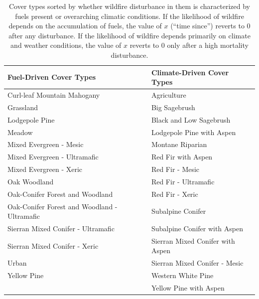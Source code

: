 \begin{itemize}
\begin{table}[htbp]
\small
\centering
\caption{Cover types sorted by whether wildfire disturbance in them is characterized by fuels present or overarching climatic conditions. If the likelihood of wildfire depends on the accumulation of fuels, the value of $x$ (``time since'') reverts to 0 after any disturbance. If the likelihood of wildfire depends primarily on climate and weather conditions, the value of $x$ reverts to 0 only after a high mortality disturbance.}
\label{howdriven}
\begin{tabular}{ll}
\hline
\textbf{Fuel-Driven Cover Types} 				& \textbf{Climate-Driven Cover Types}	\\
\hline
Curl-leaf Mountain Mahogany 					& Agriculture   						\\
Grassland     									& Big Sagebrush 						\\
Lodgepole Pine    								& Black and Low Sagebrush				\\
Meadow											& Lodgepole Pine with Aspen 			\\
Mixed Evergreen - Mesic							& Montane Riparian						\\
Mixed Evergreen - Ultramafic     				& Red Fir with Aspen   					\\
Mixed Evergreen - Xeric 						& Red Fir - Mesic    					\\
Oak Woodland 									& Red Fir - Ultramafic 					\\
Oak-Conifer Forest and Woodland 				& Red Fir - Xeric 						\\ 	
Oak-Conifer Forest and Woodland - Ultramafic 	& Subalpine Conifer 					\\
Sierran Mixed Conifer - Ultramafic 				& Subalpine Conifer with Aspen 			\\
Sierran Mixed Conifer - Xeric 					& Sierran Mixed Conifer with Aspen 		\\
Urban 											& Sierran Mixed Conifer - Mesic 		\\
Yellow Pine 									& Western White Pine 					\\
												& Yellow Pine with Aspen 				\\
\hline
\end{tabular}
\end{table}




\end{itemize}
